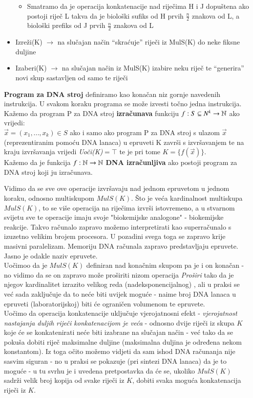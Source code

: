 \documentclass[a4paper,oneside,12pt]{memoir} %
\begin{document}
\begin{spacing}{1.5}
\begin{defn}
\begin{itemize}
\begin{itemize}
                \item Smatramo da je operacija konkatenacije nad riječima H i J dopuštena ako postoji riječ L takva da je biološki sufiks od H prvih $\frac{n}{2}$  znakova od L, a biološki prefiks od J prvih $\frac{n}{2}$ znakova od L
            \end{itemize}
    \item Izreži(K) $\to$ na slučajan način “skraćuje” riječi iz MulS(K) do neke fiksne duljine
    \item Izaberi(K) $\to$ na slučajan način iz MulS(K) izabire neku riječ te “generira” novi skup sastavljen od samo te riječi

    \end{itemize}
    \textbf{Program za DNA stroj} definiramo kao konačan niz gornje navedenih instrukcija. U svakom koraku programa se može izvesti točno jedna instrukcija.  Kažemo da program P za DNA stroj \textbf{izračunava} funkciju $f:S \subseteq N^k \to \mathbb{N}$ ako vrijedi:\\
$\vec{x}=(x_1,...,x_k) \in S$ ako i samo ako program P za DNA stroj s ulazom  $\vec{x}$ (reprezentiranim pomoću DNA lanaca) u epruveti K završi s izvršavanjem te na kraju izvršavanja vrijedi \textit{Uoči(K)}$=\top$ te je pri tome $K=\{f(\vec{x})\}$.\\
Kažemo da je funkcija $f:\mathbb{N} \to \mathbb{N}$ \textbf{DNA izračunljiva} ako postoji program za DNA stroj koji ju izračunava.
\end{defn}
\begin{rem}
Vidimo da se sve ove operacije izvršavaju nad jednom epruvetom u jednom koraku, odnosno multiskupom $MulS(K)$. Što je veća kardinalnost multiskupa $MulS(K)$, to se više operacija na riječima izvrši istovremeno, a u stvarnom svijetu sve te operacije imaju svoje "biokemijske analogone" - biokemijske reakcije. Takvo računalo zapravo možemo interpretirati kao superračunalo s izuzetno velikim brojem procesora. U pozadini svega toga se zapravo krije masivni paralelizam. Memoriju DNA računala zapravo predstavljaju epruvete. Jasno je odakle naziv epruvete.\\
Uočimoo da je $MulS(K)$ definiran nad konačnim skupom pa je i on konačan - no vidimo da se on zapravo može proširiti nizom operacija \textit{Proširi} tako da je njegov kardinalitet izrazito velikog reda (nadeksponencijalnog) , ali u praksi se već sada zaključuje da to neće biti uvijek moguće - naime broj DNA lanaca u epruveti (laboratorijskoj) biti će ograničen volumenom te epruvete.\\
Uočimo da operacija konkatenacije uključuje vjerojatnosni efekt - \textit{vjerojatnost nastajanja duljih riječi konkatenacijom je veća} - odnosno dvije riječi iz skupa $K$ koje će se konkatenirati neće biti izabrane na slučajan način - već tako da se pokuša dobiti riječ maksimalne duljine (maksimalna duljina je određena nekom konstantom). Iz toga očito možemo vidjeti da sam ishod DNA računanja nije sasvim siguran  - no u praksi se pokazuje (pri sintezi DNA lanaca) da je to moguće - u tu svrhu je i uvedena pretpostavka da će  se, ukoliko $MulS(K)$ sadrži velik broj kopija od svake riječi iz $K$, dobiti svaka moguća konkatenacija riječi iz $K$.
\end{rem}

\end{spacing}
\end{document}
